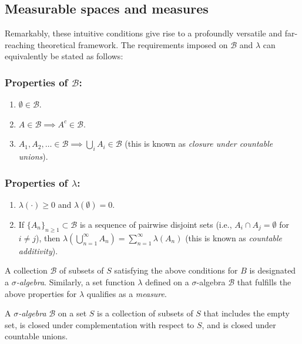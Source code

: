 \subsection{Measurable spaces and measures}
Remarkably, these  intuitive conditions give rise to a profoundly versatile and far-reaching theoretical framework. The requirements imposed on $\mathcal{B}$ and $\lambda$ can equivalently be stated as follows:

\subsubsection*{Properties of $\mathcal{B}$:}
\begin{enumerate}
    \item $\emptyset \in \mathcal{B}$.
    \item $A \in \mathcal{B}  \implies A^c \in \mathcal{B}$. 
    \item  $A_1, A_2, \dots \in \mathcal{B} \implies \bigcup_i A_i \in \mathcal{B}$ (this is known as \emph{closure
 under countable unions}).
\end{enumerate}

\subsubsection*{Properties of $\lambda$:}
\begin{enumerate}
    \item $\lambda(\cdot) \geq 0$  and $\lambda(\emptyset) = 0$.
    \item  If \(\{A_n\}_{n \geq 1} \subset \mathcal{B}\) is a sequence of pairwise disjoint sets (i.e., \(A_i \cap A_j = \emptyset\) for \(i \neq j\)), then
    $\lambda\left( \bigcup_{n=1}^\infty A_n \right) = \sum_{n=1}^\infty \lambda(A_n)$ (this is known as \emph{countable additivity}). 
\end{enumerate}

A collection $\mathcal{B}$ of subsets of $S$ satisfying the above conditions for $B$ is designated a $\sigma$\emph{-algebra}. Similarly, a set function $\lambda$ defined on a $\sigma$-algebra $\mathcal{B}$ that fulfills the above properties for $\lambda$ qualifies as a \emph{measure}.

\begin{definition} 
  A $\sigma$\emph{-algebra} $\mathcal{B}$ on a set $S$ is a collection of subsets of $S$ that includes the empty set, is closed under complementation with respect to $S$, and is closed under countable unions. 
\end{definition}

